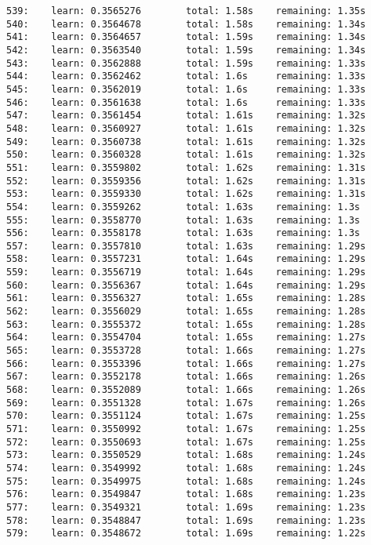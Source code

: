 \documentclass[11pt]{article}
\begin{document}
\begin{Verbatim}[commandchars=\\\{\}]
539:    learn: 0.3565276        total: 1.58s    remaining: 1.35s
540:    learn: 0.3564678        total: 1.58s    remaining: 1.34s
541:    learn: 0.3564657        total: 1.59s    remaining: 1.34s
542:    learn: 0.3563540        total: 1.59s    remaining: 1.34s
543:    learn: 0.3562888        total: 1.59s    remaining: 1.33s
544:    learn: 0.3562462        total: 1.6s     remaining: 1.33s
545:    learn: 0.3562019        total: 1.6s     remaining: 1.33s
546:    learn: 0.3561638        total: 1.6s     remaining: 1.33s
547:    learn: 0.3561454        total: 1.61s    remaining: 1.32s
548:    learn: 0.3560927        total: 1.61s    remaining: 1.32s
549:    learn: 0.3560738        total: 1.61s    remaining: 1.32s
550:    learn: 0.3560328        total: 1.61s    remaining: 1.32s
551:    learn: 0.3559802        total: 1.62s    remaining: 1.31s
552:    learn: 0.3559356        total: 1.62s    remaining: 1.31s
553:    learn: 0.3559330        total: 1.62s    remaining: 1.31s
554:    learn: 0.3559262        total: 1.63s    remaining: 1.3s
555:    learn: 0.3558770        total: 1.63s    remaining: 1.3s
556:    learn: 0.3558178        total: 1.63s    remaining: 1.3s
557:    learn: 0.3557810        total: 1.63s    remaining: 1.29s
558:    learn: 0.3557231        total: 1.64s    remaining: 1.29s
559:    learn: 0.3556719        total: 1.64s    remaining: 1.29s
560:    learn: 0.3556367        total: 1.64s    remaining: 1.29s
561:    learn: 0.3556327        total: 1.65s    remaining: 1.28s
562:    learn: 0.3556029        total: 1.65s    remaining: 1.28s
563:    learn: 0.3555372        total: 1.65s    remaining: 1.28s
564:    learn: 0.3554704        total: 1.65s    remaining: 1.27s
565:    learn: 0.3553728        total: 1.66s    remaining: 1.27s
566:    learn: 0.3553396        total: 1.66s    remaining: 1.27s
567:    learn: 0.3552178        total: 1.66s    remaining: 1.26s
568:    learn: 0.3552089        total: 1.66s    remaining: 1.26s
569:    learn: 0.3551328        total: 1.67s    remaining: 1.26s
570:    learn: 0.3551124        total: 1.67s    remaining: 1.25s
571:    learn: 0.3550992        total: 1.67s    remaining: 1.25s
572:    learn: 0.3550693        total: 1.67s    remaining: 1.25s
573:    learn: 0.3550529        total: 1.68s    remaining: 1.24s
574:    learn: 0.3549992        total: 1.68s    remaining: 1.24s
575:    learn: 0.3549975        total: 1.68s    remaining: 1.24s
576:    learn: 0.3549847        total: 1.68s    remaining: 1.23s
577:    learn: 0.3549321        total: 1.69s    remaining: 1.23s
578:    learn: 0.3548847        total: 1.69s    remaining: 1.23s
579:    learn: 0.3548672        total: 1.69s    remaining: 1.22s

\end{Verbatim}
\end{document}
